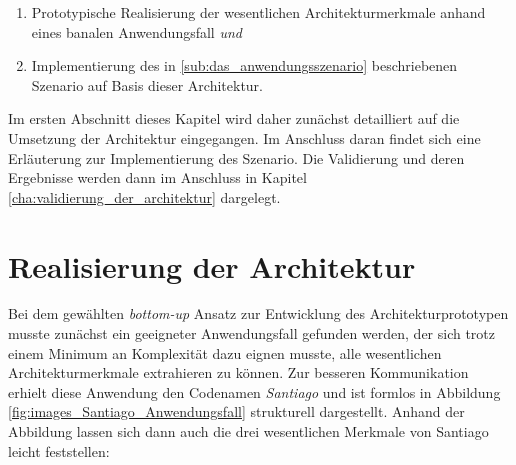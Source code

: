   \begin{enumerate}
    \item Prototypische Realisierung der wesentlichen Architekturmerkmale anhand eines banalen Anwendungsfall \emph{und}
    \item Implementierung des in \ref{sub:das_anwendungsszenario} beschriebenen Szenario auf Basis dieser Architektur.
  \end{enumerate}
  
  Im ersten Abschnitt dieses Kapitel wird daher zunächst detailliert auf die Umsetzung der Architektur eingegangen. Im Anschluss daran findet sich eine Erläuterung zur Implementierung des Szenario. Die Validierung und deren Ergebnisse werden dann im Anschluss in Kapitel \ref{cha:validierung_der_architektur} dargelegt.


\section{Realisierung der Architektur} %
\label{sec:realisierung_der_architektur}

  Bei dem gewählten \emph{bottom-up} Ansatz zur Entwicklung des Architekturprototypen musste zunächst ein geeigneter Anwendungsfall gefunden werden, der sich trotz einem Minimum an Komplexität dazu eignen musste, alle wesentlichen Architekturmerkmale extrahieren zu können. Zur besseren Kommunikation erhielt diese Anwendung den Codenamen \emph{Santiago} und ist formlos in Abbildung \ref{fig:images_Santiago_Anwendungsfall} strukturell dargestellt. Anhand der Abbildung lassen sich dann auch die drei wesentlichen Merkmale von Santiago leicht feststellen:

